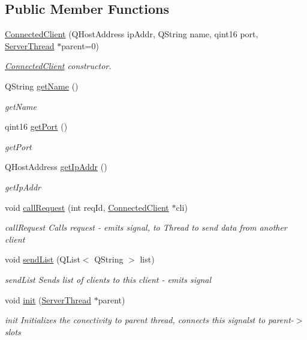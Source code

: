 \subsection*{Public Member Functions}
\begin{DoxyCompactItemize}
\item 
\hyperlink{classPenguinServer_1_1ConnectedClient_a2167c805df33e4a18d40b7078f3023ae}{Connected\-Client} (Q\-Host\-Address ip\-Addr, Q\-String name, qint16 port, \hyperlink{classPenguinServer_1_1ServerThread}{Server\-Thread} $\ast$parent=0)
\begin{DoxyCompactList}\small\item\em \hyperlink{classPenguinServer_1_1ConnectedClient}{Connected\-Client} constructor. \end{DoxyCompactList}\item 
Q\-String \hyperlink{classPenguinServer_1_1ConnectedClient_afd5c19ed689f899e464eed48a6e80038}{get\-Name} ()
\begin{DoxyCompactList}\small\item\em get\-Name \end{DoxyCompactList}\item 
qint16 \hyperlink{classPenguinServer_1_1ConnectedClient_ad263530695c1806cbbb0070fce6552d9}{get\-Port} ()
\begin{DoxyCompactList}\small\item\em get\-Port \end{DoxyCompactList}\item 
Q\-Host\-Address \hyperlink{classPenguinServer_1_1ConnectedClient_aecc94c3bcb3bee9740d10173eb73160c}{get\-Ip\-Addr} ()
\begin{DoxyCompactList}\small\item\em get\-Ip\-Addr \end{DoxyCompactList}\item 
void \hyperlink{classPenguinServer_1_1ConnectedClient_a61c876737001fd3dfb06f6cd69d255d9}{call\-Request} (int req\-Id, \hyperlink{classPenguinServer_1_1ConnectedClient}{Connected\-Client} $\ast$cli)
\begin{DoxyCompactList}\small\item\em call\-Request Calls request -\/ emits signal, to Thread to send data from another client \end{DoxyCompactList}\item 
void \hyperlink{classPenguinServer_1_1ConnectedClient_ae14d3b2ae3096c527ba387c8b204af40}{send\-List} (Q\-List$<$ Q\-String $>$ list)
\begin{DoxyCompactList}\small\item\em send\-List Sends list of clients to this client -\/ emits signal \end{DoxyCompactList}\item 
void \hyperlink{classPenguinServer_1_1ConnectedClient_a89d4ee61c9736341d640b2d7edafae3b}{init} (\hyperlink{classPenguinServer_1_1ServerThread}{Server\-Thread} $\ast$parent)
\begin{DoxyCompactList}\small\item\em init Initializes the conectivity to parent thread, connects this signalst to parent-\/$>$slots \end{DoxyCompactList}\end{DoxyCompactItemize}


